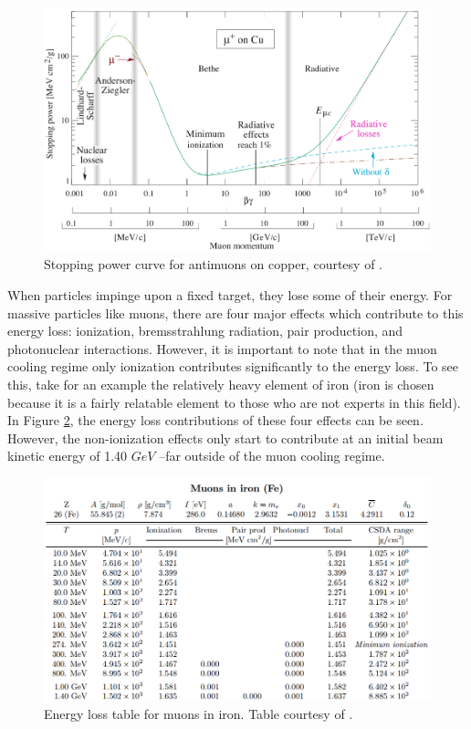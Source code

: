\begin{figure}
  \centering
    \includegraphics[width=\textwidth]{Figures/bethecurve} 
  \caption{Stopping power curve for antimuons on copper, courtesy of \cite{PDG}. }
  \label{fig:bethecurve}
\end{figure}

When particles impinge upon a fixed target, they lose some of their energy. For massive particles like muons, there are four major effects which contribute to this energy loss: ionization, bremsstrahlung radiation, pair production, and photonuclear interactions. However, it is important to note that in the muon cooling regime only ionization contributes significantly to the energy loss. To see this, take for an example the relatively heavy element of iron (iron is chosen because it is a fairly relatable element to those who are not experts in this field). In Figure \ref{fig:elossfe}, the energy loss contributions of these four effects can be seen. However, the non-ionization effects only start to contribute at an initial beam kinetic energy of 1.40 $GeV$ --far outside of the muon cooling regime.

\begin{figure}
  \centering
    \includegraphics[width=\textwidth]{Figures/E_loss_Fe} 
  \caption{Energy loss table for muons in iron. Table courtesy of \cite{PDGTables}.}
  \label{fig:elossfe}
\end{figure}

